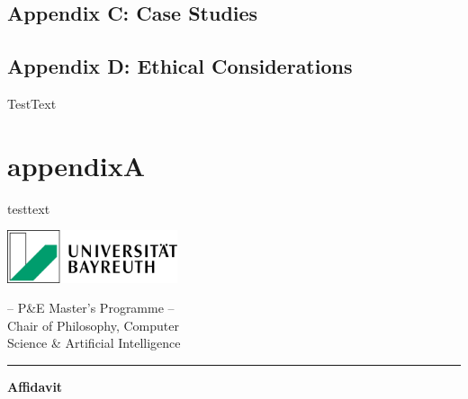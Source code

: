 \documentclass[
  letterpaper,
]{book}
\begin{document}
\section{Appendix C: Case Studies}\label{appendix-c-case-studies}

\section{Appendix D: Ethical
Considerations}\label{appendix-d-ethical-considerations}

TestText

\chapter{appendixA}\label{appendixa}

testtext


\backmatter


\clearpage
\thispagestyle{empty} %

\newpage


\begin{minipage}{0.3\textwidth}
  \includegraphics[width=5cm]{latex/uni-bayreuth-logo.png}
\end{minipage}
\hfill
\begin{minipage}{0.9\textwidth}
  \begin{center}
    -- P\&E Master's Programme --\\
    Chair of Philosophy, Computer\\
    Science \& Artificial Intelligence
  \end{center}
\end{minipage}

\vspace{1.5cm}
\hrule
\vspace{2.5cm}


  \LARGE\textbf{Affidavit}
\vspace{1.5cm}

\center

\normalsize

\end{document}
